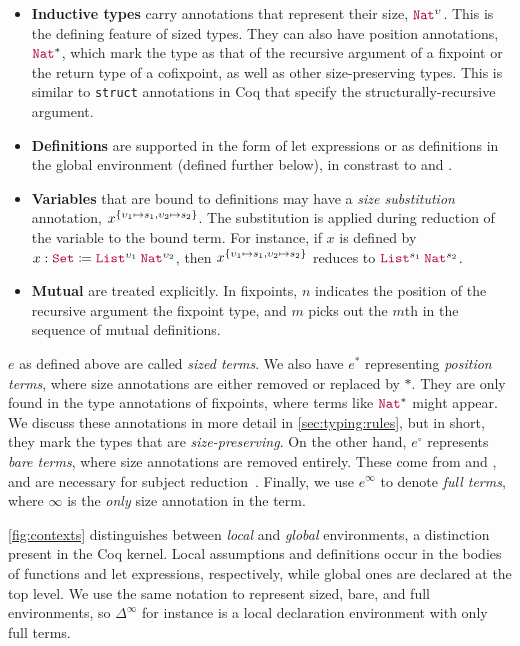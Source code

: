 \begin{itemize}
    \item \textbf{Inductive types} carry annotations that represent their size, \eg $\Nat^\upsilon$.
      This is the defining feature of sized types.
      They can also have position annotations, \eg $\Nat^*$, which mark the type as that of the recursive argument of a fixpoint or the return type of a cofixpoint, as well as other size-preserving types.
      This is similar to \texttt{struct} annotations in Coq that specify the structurally-recursive argument.
      \item \textbf{Definitions} are supported in the form of let expressions or as definitions in the global environment (defined further below),
      in constrast to \CIChat and \CIChatminus.
    \item \textbf{Variables} that are bound to definitions may have a \emph{size substitution} annotation, \eg $x^{\{\upsilon_1 \mapsto s_1, \upsilon_2 \mapsto s_2\}}$.
      The substitution is applied during reduction of the variable to the bound term.
      For instance, if $x$ is defined by $x : \Set \coloneqq \app{\List^{\upsilon_1}}{\Nat^{\upsilon_2}}$, then $x^{\{\upsilon_1 \mapsto s_1, \upsilon_2 \mapsto s_2\}}$ reduces to $\app{\List^{s_1}}{\const{Nat}^{s_2}}$.
    \item \textbf{Mutual \cofixpoints} are treated explicitly.
      In fixpoints, $n$ indicates the position of the recursive argument the fixpoint type, and $m$ picks out the $m$th \cofixpoint in the sequence of mutual definitions.
\end{itemize}

$e$ as defined above are called \textit{sized terms}.
We also have $e^*$ representing \textit{position terms},
where size annotations are either removed or replaced by $*$.
They are only found in the type annotations of fixpoints,
where terms like $\Nat^*$ might appear.
We discuss these annotations in more detail in \autoref{sec:typing:rules},
but in short, they mark the types that are \textit{size-preserving}.
On the other hand, $e^\circ$ represents \textit{bare terms},
where size annotations are removed entirely.
These come from \CIChatminus and \CIChat, and are necessary for subject reduction~\citep{cic-hat-minus}.
Finally, we use $e^\infty$ to denote \textit{full terms},
where $\infty$ is the \emph{only} size annotation in the term.



\autoref{fig:contexts} distinguishes between \textit{local} and \textit{global} environments, a distinction present in the Coq kernel.
Local assumptions and definitions occur in the bodies of functions and let expressions, respectively, while global ones are declared at the top level.
We use the same notation to represent sized, bare, and full environments,
so $\Delta^\infty$ for instance is a local declaration environment with only full terms.

